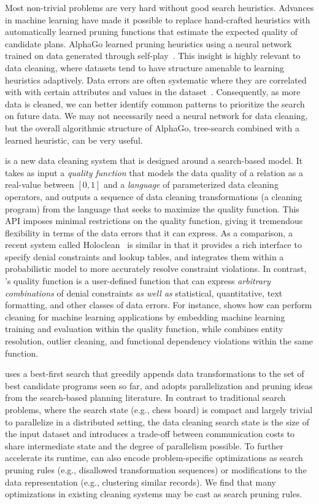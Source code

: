 Most non-trivial problems are very hard without good search heuristics.
Advances in machine learning have made it possible to replace hand-crafted heuristics with automatically learned pruning functions that estimate the expected quality of candidate plans. AlphaGo learned pruning heuristics using a neural network trained on data generated through self-play~\cite{silver2016mastering}.
This insight is highly relevant to data cleaning, where datasets tend to have structure amenable to learning heuristics adaptively.
Data errors are often systematic where they are correlated with with certain attributes and values in the dataset~\cite{rekatsinas2017holoclean,DBLP:journals/pvldb/KrishnanWWFG16}.
Consequently, as more data is cleaned, we can better identify common patterns to prioritize the search on future data.
We may not necessarily need a neural network for data cleaning, but the overall algorithmic structure of AlphaGo, tree-search combined with a learned heuristic, can be very useful.

\sys is a new data cleaning system that is designed around a search-based model. It takes as input a {\it quality function} that models the data quality of a relation as a real-value between $[0,1]$ and a {\it language} of parameterized data cleaning operators, and outputs a sequence of data cleaning transformations (a cleaning program) from the language that seeks to maximize the quality function. This API imposes minimal restrictions on the quality function, giving it tremendous flexibility in terms of the data errors that it can express.   As a comparison, a recent system called Holoclean~\cite{rekatsinas2017holoclean} is similar in that it provides a rich interface to specify denial constraints and lookup tables, and integrates them within a probabilistic model to more accurately resolve constraint violations.  In contrast, \sys's quality function is a user-defined function that can express {\it arbitrary combinations} of denial constraints {\it as well as} statistical, quantitative, text formatting, and other classes of data errors.  For instance,  shows how \sys can perform cleaning for machine learning applications by embedding machine learning training and evaluation within the quality function, while  combines entity resolution, outlier cleaning, and functional dependency violations within the same function.  


\sys uses a best-first search that greedily appends data transformations to the set of best candidate programs seen so far, and adopts parallelization and pruning ideas from the search-based planning literature.  In contrast to traditional search problems, where the search state (e.g., chess board) is compact and largely trivial to parallelize in a distributed setting, the data cleaning search state is the size of the input dataset and introduces a trade-off between communication costs to share intermediate state and the degree of parallelism possible.  
To further accelerate its runtime, \sys can also encode problem-specific optimizations as search pruning rules (e.g., disallowed transformation sequences) or modifications to the data representation (e.g., clustering similar records).  We find that many optimizations in existing cleaning systems may be cast as search pruning rules.

